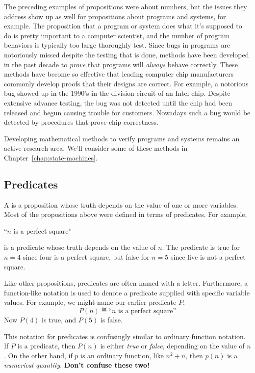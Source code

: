\begin{editingnoes}
The preceding examples of propositions were about numbers, but the
issues they address show up as well for propositions about programs
and systems, for example.  The proposition that a program or system
does what it's supposed to do is pretty important to a computer
scientist, and the number of program behaviors is typically too large
thoroughly test.  Since bugs in programs are notoriously missed
despite the testing that is done, methods have been developed in the
past decade to \emph{prove} that programs will \emph{always} behave
correctly.  These methods have become so effective that leading
computer chip manufacturers commonly develop proofs that their designs
are correct.  For example, a notorious bug showed up in the 1990's in
the division circuit of an Intel chip.  Despite extensive advance
testing, the bug was not detected until the chip had been released and
begun causing trouble for customers.  Nowadays such a bug would be
detected by procedures that prove chip correctness.

Developing mathematical methods to verify programs and systems remains
an active research area.  We'll consider some of these methods in
Chapter~\ref{chap:state-machines}.

\subsection{Predicates}
A  is a proposition whose truth depends on the value of
one or more variables.  Most of the propositions above were defined in
terms of predicates.  For example,
%
\begin{center}
``$n$ is a perfect square''
\end{center}
%
is a predicate whose truth depends on the value of $n$.  The predicate is
true for $n = 4$ since four is a perfect square, but false for $n = 5$
since five is not a perfect square.

Like other propositions, predicates are often named with a letter.
Furthermore, a function-like notation is used to denote a predicate
supplied with specific variable values.  For example, we might name
our earlier predicate $P$:
%
\[
P(n) \eqdef \text{``$n$ is a perfect square''}
\]
%
Now $P(4)$ is true, and $P(5)$ is false.

This notation for predicates is confusingly similar to ordinary function
notation.  If $P$ is a predicate, then $P(n)$ is either \emph{true} or
\emph{false}, depending on the value of $n$.  On the other hand, if $p$
is an ordinary function, like $n^2 + n$, then $p(n)$ is a
\emph{numerical quantity}.  \textbf{Don't confuse these two!}


\end{editingnoes}
